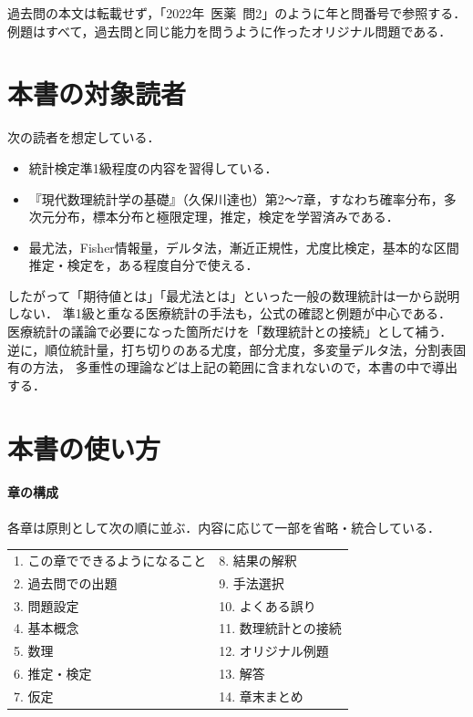 \documentclass[a4paper,11pt,openany]{ltjsbook}
\newcommand{\kakomon}[2]{\mbox{#1年 医薬 問#2}}
\begin{document}
過去問の本文は転載せず，「\kakomon{2022}{2}」のように年と問番号で参照する．
例題はすべて，過去問と同じ能力を問うように作ったオリジナル問題である．

\section*{本書の対象読者}
次の読者を想定している．
\begin{itemize}
\item 統計検定準1級程度の内容を習得している．
\item 『現代数理統計学の基礎』（久保川達也）第2〜7章，すなわち確率分布，多次元分布，標本分布と極限定理，推定，検定を学習済みである．
\item 最尤法，Fisher情報量，デルタ法，漸近正規性，尤度比検定，基本的な区間推定・検定を，ある程度自分で使える．
\end{itemize}
したがって「期待値とは」「最尤法とは」といった一般の数理統計は一から説明しない．
準1級と重なる医療統計の手法も，公式の確認と例題が中心である．
医療統計の議論で必要になった箇所だけを「数理統計との接続」として補う．
逆に，順位統計量，打ち切りのある尤度，部分尤度，多変量デルタ法，分割表固有の方法，
多重性の理論などは上記の範囲に含まれないので，本書の中で導出する．

\section*{本書の使い方}
\paragraph{章の構成}
各章は原則として次の順に並ぶ．内容に応じて一部を省略・統合している．
\begin{center}\small
\begin{tabular}{@{}ll@{}}
\toprule
1. この章でできるようになること & 8. 結果の解釈\\
2. 過去問での出題 & 9. 手法選択\\
3. 問題設定 & 10. よくある誤り\\
4. 基本概念 & 11. 数理統計との接続\\
5. 数理 & 12. オリジナル例題\\
6. 推定・検定 & 13. 解答\\
7. 仮定 & 14. 章末まとめ\\
\bottomrule
\end{tabular}
\end{center}
\end{document}
